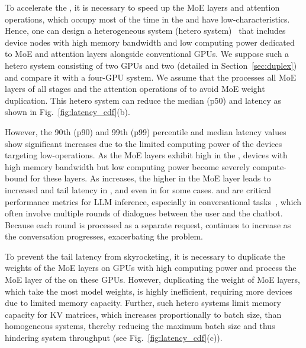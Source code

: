 To accelerate the \deconlystage, it is necessary to speed up the MoE layers and attention operations, which occupy most of the time in the \deconlystage and have low-\opb characteristics. Hence, one can design a heterogeneous system (hetero system)~\cite{asplos-2024-attacc} that includes device nodes with high memory bandwidth and low computing power dedicated to MoE and attention layers alongside conventional GPUs.
We suppose such a hetero system consisting of two GPUs and two \lowp(detailed in Section~\ref{sec:duplex}) and compare it with a four-GPU system.
We assume that the \lowp processes all MoE layers of all stages and the attention operations of  to avoid MoE weight duplication.
This hetero system can reduce the median (p50) \tbt and \ete latency as shown in Fig.~\ref{fig:latency_cdf}(b).

However, the 90th (p90) and 99th (p99) percentile \tbt and median \ttft latency values show significant increases due to the limited computing power of the devices targeting low-\opb operations.
As the MoE layers exhibit high 
\opb in the \mixedstage, devices with high memory bandwidth but low computing power become severely compute-bound for these layers. 
As \lin increases, the higher \opb in the MoE layer leads to increased \ttft and tail latency in \tbt, and even in \ete for some cases. 
\tbt and \ttft are critical performance metrics for LLM inference, especially in conversational tasks~\cite{isca-2024-splitwise}, which often involve multiple rounds of dialogues between the user and the chatbot.
Because each round is processed as a separate request, \lin continues to increase as the conversation progresses, exacerbating the problem.

To prevent the tail latency from skyrocketing, it is necessary to duplicate the weights of the MoE layers on GPUs with high computing power and process the MoE layer of the \mixedstage on these GPUs.
However, duplicating the weight of MoE layers, which take the most model weights, is highly inefficient, requiring more devices due to limited memory capacity.
Further, such hetero systems limit memory capacity for KV matrices, which increases proportionally to batch size, than homogeneous systems, thereby reducing the maximum batch size and thus hindering system throughput (see Fig.~\ref{fig:latency_cdf}(c)).

